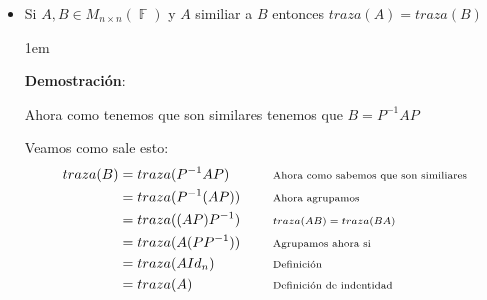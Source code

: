 \documentclass[12pt, fleqn]{report}                             %
\newenvironment{SmallIndentation}[1][0.75em]                    %
        {\begin{adjustwidth}{#1}{}\begin{footnotesize}}             %
        {\end{footnotesize}\end{adjustwidth}}                       %
\DeclareMathOperator \Space     {\quad}                         %
\newcommand \Remember[1]    {\Space\text{\scriptsize{#1}}}      %
\theoremstyle{break}                                            %
\DeclareMathOperator \GenericField {\mathbb{F}}                 %
\begin{document}
\begin{itemize}
\begin{SmallIndentation}[1em]
                            Así de sencillo
                        
                        \end{SmallIndentation}

                    \clearpage

                    \item
                        Si $A, B \in M_{n \times n}(\GenericField)$ y $A$ similiar a $B$ entonces $traza(A) = traza(B)$
                        \begin{SmallIndentation}[1em]
                            \textbf{Demostración}:

                            Ahora como tenemos que son similares tenemos que $B = P^{-1}AP$
                            
                            Veamos como sale esto:
                            \begin{align*}
                                traza(B)
                                    &= traza(P^{-1}AP)                                          
                                        && \Remember{Ahora como sabemos que son similiares}     \\
                                    &= traza(P^{-1}(AP))                                          
                                        && \Remember{Ahora agrupamos}                           \\
                                    &= traza((AP)P^{-1})                                          
                                        && \Remember{$traza(AB) = traza(BA)$}                   \\
                                    &= traza(A(PP^{-1}))                                          
                                        && \Remember{Agrupamos ahora si}                        \\
                                    &= traza(AId_n)                                          
                                        && \Remember{Definición}                                \\
                                    &= traza(A)                                        
                                        && \Remember{Definición de indentidad}
                            \end{align*}
                        
                        \end{SmallIndentation}
                            

                \end{itemize}
\end{document}
